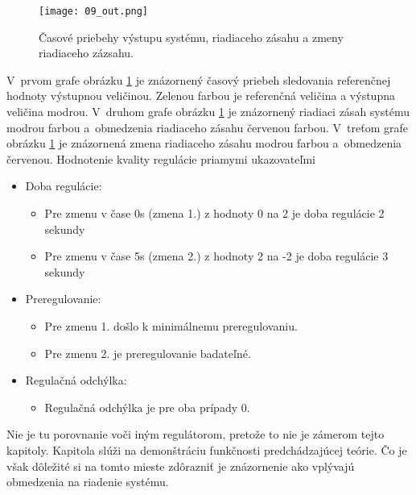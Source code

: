 \begin{figure}[h]
\centering
\texttt{[image: 09\_out.png]}
\caption{Časové priebehy výstupu systému, riadiaceho zásahu a zmeny riadiaceho zázsahu.}
\label{09_out}
\end{figure}


V~prvom grafe obrázku  \ref{09_out} je znázornený časový priebeh sledovania referenčnej hodnoty výstupnou veličinou. Zelenou farbou je referenčná veličina a výstupna veličina modrou.
V~druhom grafe obrázku  \ref{09_out} je znázornený
riadiaci zásah systému modrou farbou a~obmedzenia riadiaceho zásahu červenou farbou. V~treťom grafe obrázku  \ref{09_out} je znázornená zmena riadiaceho zásahu modrou farbou
a~obmedzenia červenou. Hodnotenie kvality regulácie priamymi ukazovateľmi \cite{MPC06}

\begin{itemize}
  \item Doba regulácie:
    \begin{itemize}
  		\item
    	Pre zmenu v čase 0s (zmena 1.) z hodnoty 0 na 2 je doba regulácie 2 sekundy
    	\item
    	Pre zmenu v čase 5s (zmena 2.) z hodnoty 2 na -2 je doba regulácie 3 sekundy
	\end{itemize}
  \item Preregulovanie:
    \begin{itemize}
  		\item
    	Pre zmenu 1. došlo k minimálnemu preregulovaniu.
    	\item
    	Pre zmenu 2. je preregulovanie badateľné.
	\end{itemize}  
  \item Regulačná odchýlka:
    \begin{itemize}
  		\item
    	Regulačná odchýlka je pre oba prípady 0.
	\end{itemize}   
\end{itemize}

Nie je tu porovnanie voči iným regulátorom, pretože to nie je zámerom tejto kapitoly. Kapitola slúži na demonštráciu funkčnosti predchádzajúcej teórie. Čo je však dôležité si na tomto mieste zdôrazniť je znázornenie ako vplývajú obmedzenia na riadenie systému. 

